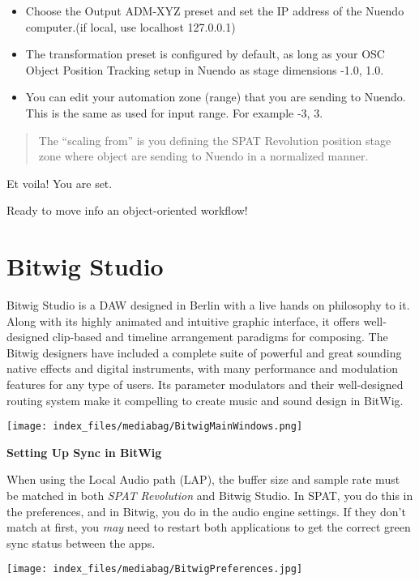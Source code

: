 \documentclass[
  letterpaper,
  DIV=11,
  numbers=noendperiod]{scrreport}
\providecommand{\tightlist}{%
  \setlength{\itemsep}{0pt}\setlength{\parskip}{0pt}}\usepackage{longtable,booktabs,array}
\begin{document}
\begin{itemize}
\tightlist
\item
  Choose the Output ADM-XYZ preset and set the IP address of the Nuendo
  computer.(if local, use localhost 127.0.0.1)
\item
  The transformation preset is configured by default, as long as your
  OSC Object Position Tracking setup in Nuendo as stage dimensions -1.0,
  1.0.
\item
  You can edit your automation zone (range) that you are sending to
  Nuendo. This is the same as used for input range. For example -3, 3.
\end{itemize}

\begin{quote}
The ``scaling from'' is you defining the SPAT Revolution position stage
zone where object are sending to Nuendo in a normalized manner.
\end{quote}

Et voila! You are set.

Ready to move info an object-oriented workflow!

\hypertarget{bitwig-studio}{%
\chapter{Bitwig Studio}\label{bitwig-studio}}

Bitwig Studio is a DAW designed in Berlin with a live hands on
philosophy to it. Along with its highly animated and intuitive graphic
interface, it offers well-designed clip-based and timeline arrangement
paradigms for composing. The Bitwig designers have included a complete
suite of powerful and great sounding native effects and digital
instruments, with many performance and modulation features for any type
of users. Its parameter modulators and their well-designed routing
system make it compelling to create music and sound design in BitWig.

\texttt{[image: index\_files/mediabag/BitwigMainWindows.png]}

\textbf{Setting Up Sync in BitWig}

When using the Local Audio path (LAP), the buffer size and sample rate
must be matched in both \emph{SPAT Revolution} and Bitwig Studio. In
SPAT, you do this in the preferences, and in Bitwig, you do in the audio
engine settings. If they don't match at first, you \emph{may} need to
restart both applications to get the correct green sync status between
the apps.

\texttt{[image: index\_files/mediabag/BitwigPreferences.jpg]}
\end{document}
